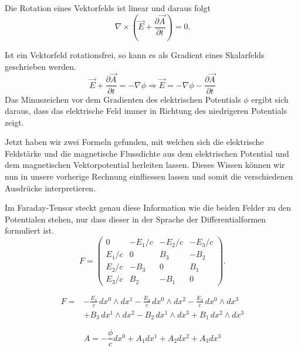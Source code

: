 Die Rotation eines Vektorfelds ist linear und daraus folgt
\begin{equation}
	\nabla \times \left( \vec{E} + \frac{\partial \vec{A}}{\partial t}\right) = 0.
\end{equation}

Ist ein Vektorfeld rotationsfrei, so kann es als Gradient eines Skalarfelds geschrieben werden.
\begin{equation}
	\vec{E} + \frac{\partial \vec{A}}{\partial t} = -\nabla \phi \Rightarrow \vec{E} = -\nabla \phi -\frac{\partial \vec{A}}{\partial t}
\end{equation}
Das Minuszeichen vor dem Gradienten des elektrischen Potentials $\phi$ ergibt sich daraus, dass das elektrische Feld immer in Richtung des niedrigeren Potentials zeigt.

Jetzt haben wir zwei Formeln gefunden, mit welchen sich die elektrische Feldstärke und die magnetische Flussdichte aus dem elektrischen Potential und dem magnetischen Vektorpotential herleiten lassen. Dieses Wissen können wir nun in unsere vorherige Rechnung einfliessen lassen und somit die verschiedenen Ausdrücke interpretieren.

Im Faraday-Tensor steckt genau diese Information wie die beiden Felder zu den Potentialen stehen, nur dass dieser in der Sprache der Differentialformen formuliert ist.
\begin{equation}
	F = \begin{pmatrix}
		0 & -E_1/c & -E_2/c & -E_3/c \\ E_1/c & 0 & B_3 & -B_2 \\ E_2/c & -B_3 & 0 & B_1 \\ E_3/c & B_2 & -B_1 & 0 
	\end{pmatrix}.
\end{equation}

\begin{align*}
	F = 
	& - \frac{E_{1}}{c} \, dx^0 \wedge dx^1 - \frac{E_{2}}{c} \, dx^0 \wedge dx^2 - \frac{E_{3}}{c} \, dx^0 \wedge dx^3 \\
	& + B_3 \, dx^1 \wedge dx^2 - B_2 \, dx^1 \wedge dx^3 + B_1 \, dx^2 \wedge dx^3
\end{align*}

\begin{equation}
	A = -\frac{\phi}{c}dx^0 + A_1 dx^1 + A_2 dx^2 + A_3 dx^3
\end{equation}

